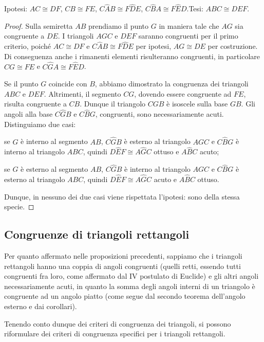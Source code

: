 \noindent Ipotesi: $AC\cong DF$, $CB\cong FE$, $C\widehat{A}B\cong F\widehat{D}E$, $C\widehat{B}A\cong F\widehat{E}D$.\tab Tesi: $ABC\cong DEF$.

\begin{proof}
Sulla semiretta $AB$ prendiamo il punto $G$ in maniera tale che $AG$ sia congruente a $DE$. I triangoli $AGC$ e $DEF$ saranno congruenti per il primo criterio, poiché $AC\cong DF$ e $C\widehat{A}B\cong F\widehat{D}E$ per ipotesi, $AG\cong DE$ per costruzione. Di conseguenza anche i rimanenti elementi risulteranno congruenti, in particolare $CG\cong FE$ e $C\widehat{G}A\cong F\widehat{E}D$.

Se il punto $G$ coincide con $B$, abbiamo dimostrato la congruenza dei triangoli $ABC$ e $DEF$. Altrimenti, il segmento $CG$, dovendo essere congruente ad $FE$, risulta congruente a $CB$. Dunque il triangolo $CGB$ è isoscele sulla base $GB$. Gli angoli alla base $C\widehat{G}B$ e $C\widehat{B}G$, congruenti, sono necessariamente acuti. Distinguiamo due casi:
\begin{itemize*}
\item se $G$ è interno al segmento $AB$, $C\widehat{G}B$ è esterno al triangolo $AGC$ e $C\widehat{B}G$ è interno al triangolo $ABC$, quindi $D\widehat{E}F\cong A\widehat{G}C$ ottuso e $A\widehat{B}C$ acuto;
\item se $G$ è esterno al segmento $AB$, $C\widehat{G}B$ è interno al triangolo $AGC$ e $C\widehat{B}G$ è esterno al triangolo $ABC$, quindi $D\widehat{E}F\cong A\widehat{G}C$ acuto e $A\widehat{B}C$ ottuso.
\end{itemize*}
Dunque, in nessuno dei due casi viene rispettata l'ipotesi: sono della stessa specie.
\end{proof}

\subsection{Congruenze di triangoli rettangoli}

Per quanto affermato nelle proposizioni precedenti, sappiamo che i triangoli rettangoli hanno una coppia di angoli congruenti (quelli retti, essendo tutti congruenti fra loro, come affermato dal IV postulato di Euclide) e gli altri angoli necessariamente acuti, in quanto la somma degli angoli interni di un triangolo è congruente ad un angolo piatto (come segue dal secondo teorema dell'angolo esterno e dai corollari).

Tenendo conto dunque dei criteri di congruenza dei triangoli, si possono riformulare dei criteri di congruenza specifici per i triangoli rettangoli.



%

